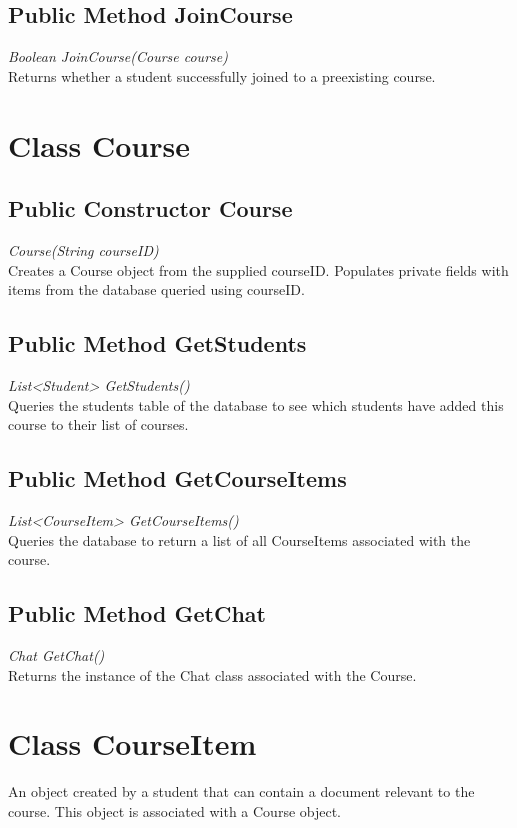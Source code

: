 \documentclass[16pt]{scrreprt}
\begin{document}
\subsection{Public Method JoinCourse}
\textit{Boolean JoinCourse(Course course)} \\
Returns whether a student successfully joined to a preexisting course.

\section{Class Course}

\subsection{Public Constructor Course}
\textit{Course(String courseID)} \\
Creates a Course object from the supplied courseID. Populates private fields with items from the database queried using courseID.

\subsection{Public Method GetStudents}
\textit{List<Student> GetStudents()} \\
Queries the students table of the database to see which students have added this course to their list of courses.

\subsection{Public Method GetCourseItems}
\textit{List<CourseItem> GetCourseItems()} \\
Queries the database to return a list of all CourseItems associated with the course.

\subsection{Public Method GetChat}
\textit{Chat GetChat()} \\
Returns the instance of the Chat class associated with the Course.

\section{Class CourseItem}
An object created by a student that can contain a document relevant to the course. This object is associated with a Course object.
\end{document}

